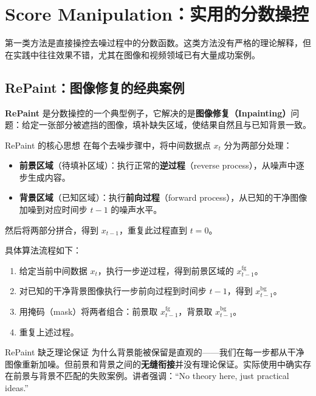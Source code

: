 \section{Score Manipulation：实用的分数操控}

第一类方法是直接操控去噪过程中的分数函数。这类方法没有严格的理论解释，但在实践中往往效果不错，尤其在图像和视频领域已有大量成功案例。

\subsection{RePaint：图像修复的经典案例}

\textbf{RePaint} 是分数操控的一个典型例子，它解决的是\textbf{图像修复（Inpainting）}问题：给定一张部分被遮挡的图像，填补缺失区域，使结果自然且与已知背景一致。

\begin{importantbox}{RePaint 的核心思想}
在每个去噪步骤中，将中间数据点 $x_t$ 分为两部分处理：
\begin{itemize}
    \item \textbf{前景区域}（待填补区域）：执行正常的\textbf{逆过程}（reverse process），从噪声中逐步生成内容。
    \item \textbf{背景区域}（已知区域）：执行\textbf{前向过程}（forward process），从已知的干净图像加噪到对应时间步 $t-1$ 的噪声水平。
\end{itemize}
然后将两部分拼合，得到 $x_{t-1}$，重复此过程直到 $t=0$。
\end{importantbox}

具体算法流程如下：
\begin{enumerate}
    \item 给定当前中间数据 $x_t$，执行一步逆过程，得到前景区域的 $x_{t-1}^{\text{fg}}$。
    \item 对已知的干净背景图像执行一步前向过程到时间步 $t-1$，得到 $x_{t-1}^{\text{bg}}$。
    \item 用掩码（mask）将两者组合：前景取 $x_{t-1}^{\text{fg}}$，背景取 $x_{t-1}^{\text{bg}}$。
    \item 重复上述过程。
\end{enumerate}

\begin{warningbox}{RePaint 缺乏理论保证}
为什么背景能被保留是直观的——我们在每一步都从干净图像重新加噪。但前景和背景之间的\textbf{无缝衔接}并没有理论保证。实际使用中确实存在前景与背景不匹配的失败案例。讲者强调：``No theory here, just practical ideas.''
\end{warningbox}

